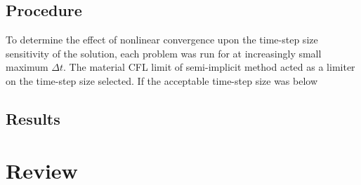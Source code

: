 \subsection{Procedure}
\label{subsect:experiments_procedure}
To determine the effect of nonlinear convergence upon the time-step size sensitivity of the solution, each problem was run for at increasingly small maximum $\Delta t$.
The material CFL limit of semi-implicit method acted as a limiter on the time-step size selected.
If the acceptable time-step size was below

\subsection{Results}
\label{subsect:results}


\section{Review}
\label{sect:review}

